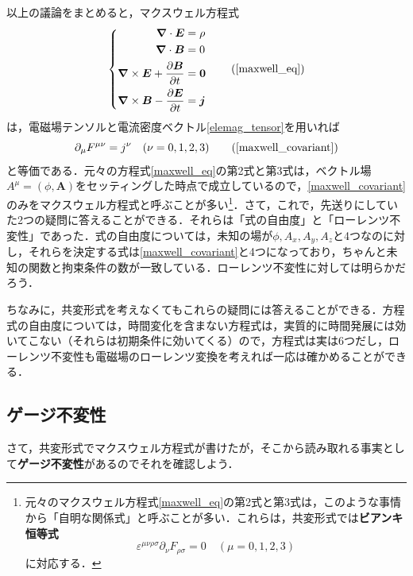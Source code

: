 \documentclass[a4paper,pdflatex,ja=standard]{bxjsarticle}
\begin{document}
以上の議論をまとめると，マクスウェル方程式
\begin{equation}
  \left\{
    \begin{alignedat}{1}
      \bm{\nabla}\cdot\bm{E}
      &=
      \rho
      \\
      \bm{\nabla}\cdot\bm{B}
      &=
      0
      \\
      \bm{\nabla}\times\bm{E}+\pdv{\bm{B}}{t}
      &=
      \bm{0}
      \\
      \bm{\nabla}\times\bm{B}
      -
      \pdv{\bm{E}}{t}
      &=
      \bm{j}
    \end{alignedat}
  \right.
  \tag{\ref{maxwell_eq}}
\end{equation}
は，電磁場テンソルと電流密度ベクトル\eqref{elemag_tensor}を用いれば
\begin{equation}
  \partial_{\mu}F^{\mu\nu}
  =
  j^{\nu}
  \quad
  (\nu=0,1,2,3)
  \tag{\ref{maxwell_covariant}}
\end{equation}
と等価である．元々の方程式\eqref{maxwell_eq}の第2式と第3式は，ベクトル場$A^{\mu}=(\phi,\bm{A})$をセッティングした時点で成立しているので，\eqref{maxwell_covariant}のみをマクスウェル方程式と呼ぶことが多い\footnote{
  元々のマクスウェル方程式\eqref{maxwell_eq}の第2式と第3式は，このような事情から「自明な関係式」と呼ぶことが多い．これらは，共変形式では\textbf{ビアンキ恒等式}
  $$
    \varepsilon^{\mu\nu\rho\sigma}
    \partial_{\nu}F_{\rho\sigma}
    =
    0
    \quad
    (\mu=0,1,2,3)
  $$
  に対応する．
}．さて，これで，先送りにしていた2つの疑問に答えることができる．それらは「式の自由度」と「ローレンツ不変性」であった．式の自由度については，未知の場が$\phi,A_x,A_y,A_z$と4つなのに対し，それらを決定する式は\eqref{maxwell_covariant}と4つになっており，ちゃんと未知の関数と拘束条件の数が一致している．ローレンツ不変性に対しては明らかだろう．

\vspace{10pt}
{\small
  ちなみに，共変形式を考えなくてもこれらの疑問には答えることができる．方程式の自由度については，時間変化を含まない方程式は，実質的に時間発展には効いてこない（それらは初期条件に効いてくる）ので，方程式は実は6つだし，ローレンツ不変性も電磁場のローレンツ変換を考えれば一応は確かめることができる．
}


\subsection{ゲージ不変性}

さて，共変形式でマクスウェル方程式が書けたが，そこから読み取れる事実として\textbf{ゲージ不変性}があるのでそれを確認しよう．
\end{document}
